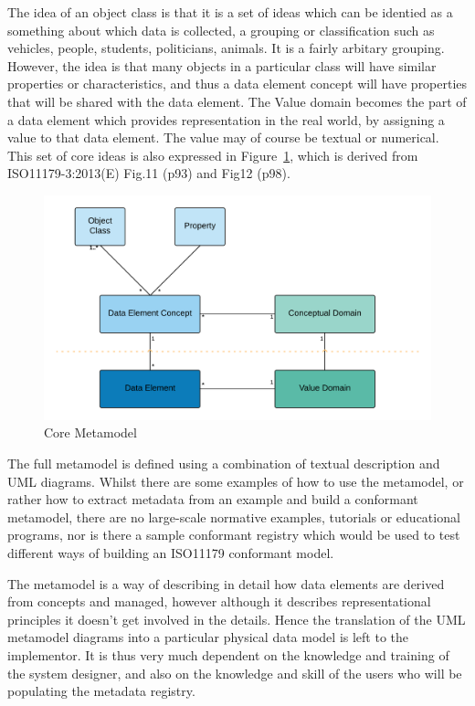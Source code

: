 \documentclass{article}
\begin{document}
The idea of an object class is that it is a set of ideas which can be identied as a something about which data is collected, a grouping or classification such as vehicles, people, students, politicians, animals. It is a fairly arbitary grouping. However, the idea is that many objects in a particular class will have similar properties or characteristics, and thus a data element concept will have properties that will be shared with the data element. The Value domain becomes the part of a data element which provides representation in the real world, by assigning a value to that data element. The value may of course be textual or numerical. This set of core ideas is also expressed in Figure~\ref{fig:core}, which is derived from ISO11179-3:2013(E) Fig.11 (p93) and Fig12 (p98).

\begin{figure}[h]
	\includegraphics[scale=0.42]{Figs/ISO11179SimpleCore}
	\caption{Core Metamodel}
	\label{fig:core}
\end{figure}

The full metamodel is defined using a combination of textual description and UML diagrams. Whilst there are some examples of how to use the metamodel, or rather how to extract metadata from an example and build a conformant metamodel, there are no large-scale normative examples, tutorials or educational programs, nor is there a sample conformant registry which would be used to test different ways of building an ISO11179 conformant model. 

The metamodel is a way of describing in detail how data elements are derived from concepts and managed, however although it describes representational principles it doesn't get involved in the details. Hence the translation of the UML metamodel diagrams into a particular physical data model is left to the implementor. It is thus very much dependent on the knowledge and training of the system designer, and also on the knowledge and skill of the users who will be populating the metadata registry. 
\end{document}
